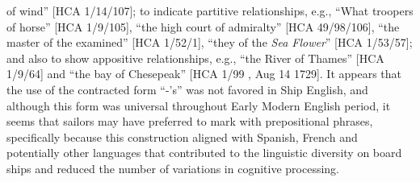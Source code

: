of wind” [HCA 1/14/107]; to indicate partitive relationships, e.g., “What troopers of horse” [HCA 1/9/105], “the high court of admiralty” [HCA 49/98/106], “the master of the examined” [HCA 1/52/1], “they of the \textit{Sea Flower}” [HCA 1/53/57]; and also to show appositive relationships, e.g., “the River of Thames” [HCA 1/9/64] and “the bay of Chesepeak” [HCA 1/99 , Aug 14 1729]. It appears that the use of the contracted form “-’s” was not favored in Ship English, and although this form was universal throughout Early Modern English period, it seems that sailors may have preferred to mark  with prepositional phrases, specifically because this construction aligned with Spanish, French and potentially other languages that contributed to the linguistic diversity on board ships and reduced the number of variations in cognitive processing.

